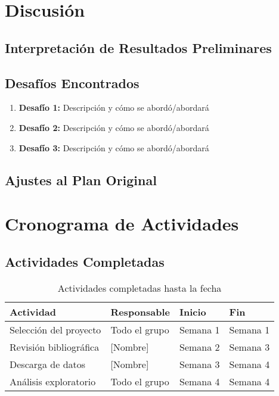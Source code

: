 \documentclass[11pt,letterpaper]{article}
\begin{document}
\section{Discusión}

\subsection{Interpretación de Resultados Preliminares}


\subsection{Desafíos Encontrados}

\begin{enumerate}
    \item \textbf{Desafío 1:} Descripción y cómo se abordó/abordará
    \item \textbf{Desafío 2:} Descripción y cómo se abordó/abordará
    \item \textbf{Desafío 3:} Descripción y cómo se abordó/abordará
\end{enumerate}

\subsection{Ajustes al Plan Original}



\section{Cronograma de Actividades}

\subsection{Actividades Completadas}

\begin{table}[H]
\centering
\caption{Actividades completadas hasta la fecha}
\begin{tabular}{@{}llll@{}}
\toprule
\textbf{Actividad} & \textbf{Responsable} & \textbf{Inicio} & \textbf{Fin} \\
\midrule
Selección del proyecto & Todo el grupo & Semana 1 & Semana 1 \\
Revisión bibliográfica & [Nombre] & Semana 2 & Semana 3 \\
Descarga de datos & [Nombre] & Semana 3 & Semana 4 \\
Análisis exploratorio & Todo el grupo & Semana 4 & Semana 4 \\
\bottomrule
\end{tabular}
\end{table}
\end{document}
